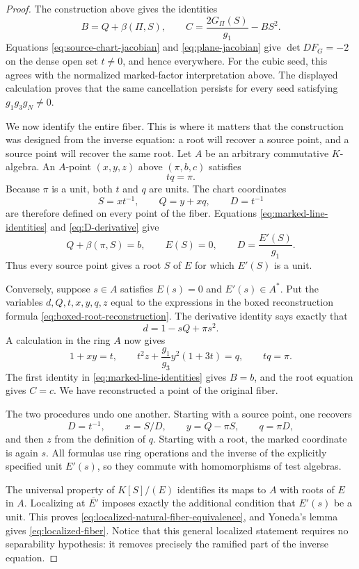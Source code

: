 \begin{proof}
The construction above gives the identities
\begin{equation}
 B=Q+\beta(\Pi,S),
 \qquad
 C=\frac{2G_\Pi(S)}{g_1}-BS^2.
 \label{eq:marked-line-identities}
\end{equation}
Equations \eqref{eq:source-chart-jacobian} and
\eqref{eq:plane-jacobian} give \(\det DF_G=-2\) on the dense open set
\(t\neq0\), and hence everywhere.
For the cubic seed, this agrees with the normalized marked-factor
interpretation above.  The displayed calculation proves that the same
cancellation persists for every seed satisfying \(g_1g_3g_N\neq0\).

We now identify the entire fiber.  This is where it matters that the
construction was designed from the inverse equation: a root will recover a
source point, and a source point will recover the same root.  Let $A$ be an
arbitrary commutative
$K$-algebra.  An $A$-point $(x,y,z)$ above $(\pi,b,c)$ satisfies
\[
 tq=\pi.
\]
Because $\pi$ is a unit, both $t$ and $q$ are units.  The chart coordinates
\[
 S=xt^{-1},
 \qquad Q=y+xq,
 \qquad D=t^{-1}
\]
are therefore defined on every point of the fiber.  Equations
\eqref{eq:marked-line-identities} and \eqref{eq:D-derivative} give
\[
 Q+\beta(\pi,S)=b,
 \qquad E(S)=0,
 \qquad D=\frac{E'(S)}{g_1}.
\]
Thus every source point gives a root $S$ of $E$ for which $E'(S)$ is a unit.

Conversely, suppose $s\in A$ satisfies $E(s)=0$ and $E'(s)\in A^*$.  Put
the variables \(d,Q,t,x,y,q,z\) equal to the expressions in the boxed
reconstruction formula \eqref{eq:boxed-root-reconstruction}.
The derivative identity says exactly that
\[
 d=1-sQ+\pi s^2.
\]
A calculation in the ring $A$ now gives
\[
 1+xy=t,
 \qquad
 t^2z+\frac{g_1}{g_3}y^2(1+3t)=q,
 \qquad tq=\pi.
\]
The first identity in \eqref{eq:marked-line-identities} gives $B=b$, and the
root equation gives $C=c$.  We have reconstructed a point of the original
fiber.

The two procedures undo one another.  Starting with a source point, one
recovers
\[
 D=t^{-1},\qquad x=S/D,\qquad y=Q-\pi S,\qquad q=\pi D,
\]
and then $z$ from the definition of $q$.  Starting with a root, the marked
coordinate is again $s$.  All formulas use ring operations and the inverse of
the explicitly specified unit $E'(s)$, so they commute with homomorphisms of
test algebras.

The universal property of $K[S]/(E)$ identifies its maps to $A$ with roots of
$E$ in $A$.  Localizing at $\overline{E'}$ imposes exactly the additional
condition that $E'(s)$ be a unit.  This proves
\eqref{eq:localized-natural-fiber-equivalence}, and Yoneda's lemma gives
\eqref{eq:localized-fiber}.  Notice that this general localized statement
requires no separability hypothesis: it removes precisely the ramified part
of the inverse equation.


\end{proof}
